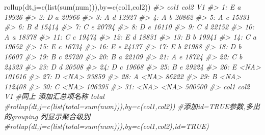 \documentclass[
]{book}
\newenvironment{Shaded}{\begin{snugshade}}{\end{snugshade}}
\newcommand{\AttributeTok}[1]{\textcolor[rgb]{0.77,0.63,0.00}{#1}}
\newcommand{\CommentTok}[1]{\textcolor[rgb]{0.56,0.35,0.01}{\textit{#1}}}
\newcommand{\FunctionTok}[1]{\textcolor[rgb]{0.00,0.00,0.00}{#1}}
\newcommand{\NormalTok}[1]{#1}
\newcommand{\StringTok}[1]{\textcolor[rgb]{0.31,0.60,0.02}{#1}}
\begin{document}
\begin{Shaded}
\begin{Highlighting}[]
\FunctionTok{rollup}\NormalTok{(dt,}\AttributeTok{j=}\FunctionTok{c}\NormalTok{(}\FunctionTok{list}\NormalTok{(}\FunctionTok{sum}\NormalTok{(num))),}\AttributeTok{by=}\FunctionTok{c}\NormalTok{(}\StringTok{\textquotesingle{}col1\textquotesingle{}}\NormalTok{,}\StringTok{\textquotesingle{}col2\textquotesingle{}}\NormalTok{))}
\CommentTok{\#\textgreater{}     col1 col2     V1}
\CommentTok{\#\textgreater{}  1:    E    a  19926}
\CommentTok{\#\textgreater{}  2:    D    a  20966}
\CommentTok{\#\textgreater{}  3:    A    d  12927}
\CommentTok{\#\textgreater{}  4:    A    b  20862}
\CommentTok{\#\textgreater{}  5:    A    c  15331}
\CommentTok{\#\textgreater{}  6:    B    d  15414}
\CommentTok{\#\textgreater{}  7:    C    e  20794}
\CommentTok{\#\textgreater{}  8:    D    e  16110}
\CommentTok{\#\textgreater{}  9:    C    d  22152}
\CommentTok{\#\textgreater{} 10:    A    a  18378}
\CommentTok{\#\textgreater{} 11:    C    c  19474}
\CommentTok{\#\textgreater{} 12:    E    d  18831}
\CommentTok{\#\textgreater{} 13:    B    b  19941}
\CommentTok{\#\textgreater{} 14:    C    a  19652}
\CommentTok{\#\textgreater{} 15:    E    c  16734}
\CommentTok{\#\textgreater{} 16:    E    e  24137}
\CommentTok{\#\textgreater{} 17:    E    b  21988}
\CommentTok{\#\textgreater{} 18:    D    b  16607}
\CommentTok{\#\textgreater{} 19:    B    c  25720}
\CommentTok{\#\textgreater{} 20:    B    a  22109}
\CommentTok{\#\textgreater{} 21:    A    e  18724}
\CommentTok{\#\textgreater{} 22:    C    b  24323}
\CommentTok{\#\textgreater{} 23:    D    d  20508}
\CommentTok{\#\textgreater{} 24:    D    c  19668}
\CommentTok{\#\textgreater{} 25:    B    e  29224}
\CommentTok{\#\textgreater{} 26:    E \textless{}NA\textgreater{} 101616}
\CommentTok{\#\textgreater{} 27:    D \textless{}NA\textgreater{}  93859}
\CommentTok{\#\textgreater{} 28:    A \textless{}NA\textgreater{}  86222}
\CommentTok{\#\textgreater{} 29:    B \textless{}NA\textgreater{} 112408}
\CommentTok{\#\textgreater{} 30:    C \textless{}NA\textgreater{} 106395}
\CommentTok{\#\textgreater{} 31: \textless{}NA\textgreater{} \textless{}NA\textgreater{} 500500}
\CommentTok{\#\textgreater{}     col1 col2     V1}
\CommentTok{\#同上 添加汇总项名称 total}
\CommentTok{\#rollup(dt,j=c(list(total=sum(num))),by=c(\textquotesingle{}col1\textquotesingle{},\textquotesingle{}col2\textquotesingle{}))}
\CommentTok{\#添加id=TRUE参数,多出的grouping 列显示聚合级别}
\CommentTok{\#rollup(dt,j=c(list(total=sum(num))),by=c(\textquotesingle{}col1\textquotesingle{},\textquotesingle{}col2\textquotesingle{}),id=TRUE)}
\end{Highlighting}
\end{Shaded}
\end{document}
